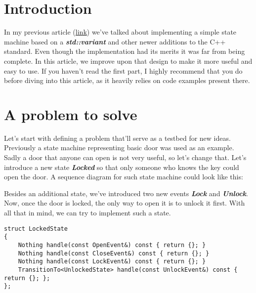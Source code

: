 \documentclass{article}[8pt]
\newcommand{\code}[1]{\textbf{\textit{#1}}}
\newcommand{\locked}{\code{Locked}}
\newcommand{\lock}{\code{Lock}}
\newcommand{\unlock}{\code{Unlock}}
\begin{document}
\section*{Introduction}
In my previous article (\href{https://sii.pl/blog/implementing-a-state-machine-in-c17/}{link}) we've talked about implementing a simple state machine based on a \code{std::variant} and other newer additions to the C++ standard.
Even though the implementation had its merits it was far from being complete. In this article, we improve upon that design to make it more useful and easy to use. If you haven't read the first part, I highly recommend that you do before diving into this article, as it heavily relies on code examples present there.

\section*{A problem to solve}

Let's start with defining a problem that'll serve as a testbed for new ideas. Previously a state machine representing basic door was used as an example. Sadly a door that anyone can open is not very useful, so let's change that. Let's introduce a new state \locked{} so that only someone who knows the key could open the door. A sequence diagram for such state machine could look like this:


Besides an additional state, we've introduced two new events \lock{} and \unlock{}. Now, once the door is locked, the only way to open it is to unlock it first. With all that in mind, we can try to implement such a state.

\bigskip
\begin{verbatim}
struct LockedState
{
	Nothing handle(const OpenEvent&) const { return {}; }
	Nothing handle(const CloseEvent&) const { return {}; }
	Nothing handle(const LockEvent&) const { return {}; }
	TransitionTo<UnlockedState> handle(const UnlockEvent&) const { return {}; };
};
\end{verbatim}
\bigskip
\end{document}

